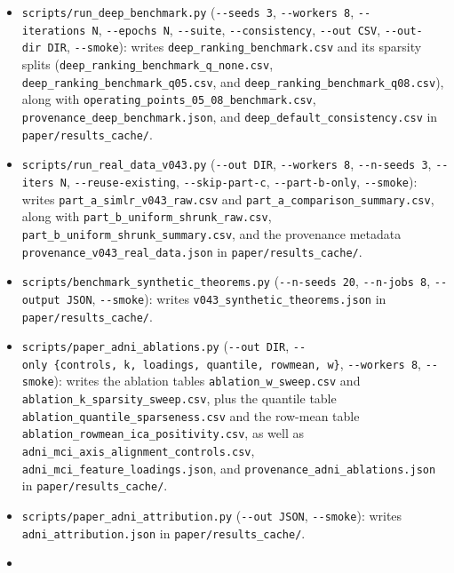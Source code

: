 \documentclass[
  10pt,
  letterpaper,
]{report}
\newcounter{none} %
\providecommand{\tightlist}{%
  \setlength{\itemsep}{0pt}\setlength{\parskip}{0pt}}
\begin{document}
\begin{itemize}
\tightlist
\item
  \texttt{scripts/run\_deep\_benchmark.py} (\texttt{-\/-seeds\ 3},
  \texttt{-\/-workers\ 8}, \texttt{-\/-iterations\ N},
  \texttt{-\/-epochs\ N}, \texttt{-\/-suite}, \texttt{-\/-consistency},
  \texttt{-\/-out\ CSV}, \texttt{-\/-out-dir\ DIR}, \texttt{-\/-smoke}):
  writes \texttt{deep\_ranking\_benchmark.csv} and its sparsity splits
  (\texttt{deep\_ranking\_benchmark\_q\_none.csv},
  \texttt{deep\_ranking\_benchmark\_q05.csv}, and
  \texttt{deep\_ranking\_benchmark\_q08.csv}), along with
  \texttt{operating\_points\_05\_08\_benchmark.csv},
  \texttt{provenance\_deep\_benchmark.json}, and
  \texttt{deep\_default\_consistency.csv} in
  \texttt{paper/results\_cache/}.
\item
  \texttt{scripts/run\_real\_data\_v043.py} (\texttt{-\/-out\ DIR},
  \texttt{-\/-workers\ 8}, \texttt{-\/-n-seeds\ 3},
  \texttt{-\/-iters\ N}, \texttt{-\/-reuse-existing},
  \texttt{-\/-skip-part-c}, \texttt{-\/-part-b-only},
  \texttt{-\/-smoke}): writes \texttt{part\_a\_simlr\_v043\_raw.csv} and
  \texttt{part\_a\_comparison\_summary.csv}, along with
  \texttt{part\_b\_uniform\_shrunk\_raw.csv},
  \texttt{part\_b\_uniform\_shrunk\_summary.csv}, and the provenance
  metadata \texttt{provenance\_v043\_real\_data.json} in
  \texttt{paper/results\_cache/}.
\item
  \texttt{scripts/benchmark\_synthetic\_theorems.py}
  (\texttt{-\/-n-seeds\ 20}, \texttt{-\/-n-jobs\ 8},
  \texttt{-\/-output\ JSON}, \texttt{-\/-smoke}): writes
  \texttt{v043\_synthetic\_theorems.json} in
  \texttt{paper/results\_cache/}.
\item
  \texttt{scripts/paper\_adni\_ablations.py} (\texttt{-\/-out\ DIR},
  \texttt{-\/-only\ \{controls,\ k,\ loadings,\ quantile,\ rowmean,\ w\}},
  \texttt{-\/-workers\ 8}, \texttt{-\/-smoke}): writes the ablation
  tables \texttt{ablation\_w\_sweep.csv} and
  \texttt{ablation\_k\_sparsity\_sweep.csv}, plus the quantile table
  \texttt{ablation\_quantile\_sparseness.csv} and the row-mean table
  \texttt{ablation\_rowmean\_ica\_positivity.csv}, as well as
  \texttt{adni\_mci\_axis\_alignment\_controls.csv},
  \texttt{adni\_mci\_feature\_loadings.json}, and
  \texttt{provenance\_adni\_ablations.json} in
  \texttt{paper/results\_cache/}.
\item
  \texttt{scripts/paper\_adni\_attribution.py} (\texttt{-\/-out\ JSON},
  \texttt{-\/-smoke}): writes \texttt{adni\_attribution.json} in
  \texttt{paper/results\_cache/}.
\item

\end{itemize}
\end{document}
